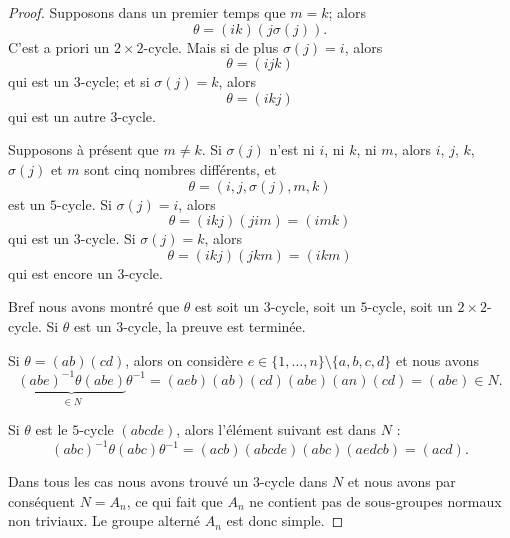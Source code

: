 \begin{proof}
    Supposons dans un premier temps que \( m=k\); alors
    \begin{equation}
        \theta=(ik)(j\sigma(j)).
    \end{equation}
    C'est a priori un \( 2\times 2\)-cycle. Mais si de plus \( \sigma(j) = i \), alors
    \begin{equation}
        \theta=(ijk)
    \end{equation}
    qui est un \( 3\)-cycle; et si \( \sigma(j) = k \), alors
    \begin{equation}
        \theta=(ikj)
    \end{equation}
    qui est un autre \( 3\)-cycle.
    
    Supposons à présent que \( m \neq k \). Si \( \sigma(j) \) n'est ni $i$, ni $k$, ni $m$, alors \( i\), \( j\), \( k\), \( \sigma(j)\) et \( m\) sont cinq nombres différents, et 
    \begin{equation}
        \theta=(i,j,\sigma(j),m,k)
    \end{equation}
    est un \( 5\)-cycle. Si \( \sigma(j) = i\), alors
    \begin{equation}
        \theta=(ikj)(jim) = (imk)
    \end{equation}
    qui est un \( 3\)-cycle. Si \( \sigma(j)=k\), alors
    \begin{equation}
        \theta=(ikj)(jkm) = (ikm)
    \end{equation}
    qui est encore un \( 3\)-cycle.

    Bref nous avons montré que \( \theta\) est soit un \( 3\)-cycle, soit un \( 5\)-cycle, soit un \( 2\times 2\)-cycle. Si \( \theta\) est un \( 3\)-cycle, la preuve est terminée.

    Si \( \theta=(ab)(cd)\), alors on considère \( e\in \{ 1,\ldots, n \}\setminus\{ a,b,c,d \}\) et nous avons
    \begin{equation}
        \underbrace{(abe)^{-1}\theta(abe)}_{\in N}\theta^{-1}=(aeb)(ab)(cd)(abe)(an)(cd)=(abe)\in N.
    \end{equation}
    
    Si \( \theta\) est le \( 5\)-cycle \( (abcde)\), alors l'élément suivant est dans \( N\) :
    \begin{equation}
        (abc)^{-1}\theta(abc)\theta^{-1}=(acb)(abcde)(abc)(aedcb)=(acd).
    \end{equation}
    
    Dans tous les cas nous avons trouvé un \( 3\)-cycle dans \( N\) et nous avons par conséquent \( N=A_n\), ce qui fait que \( A_n\) ne contient pas de sous-groupes normaux non triviaux. Le groupe alterné \( A_n\) est donc simple.
\end{proof}

